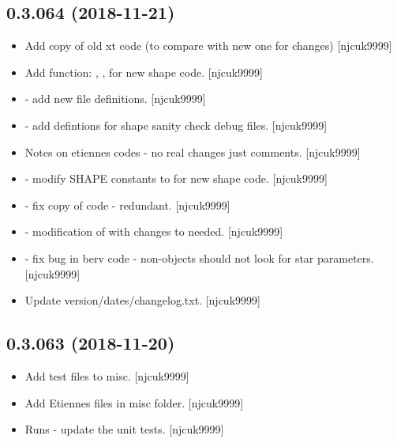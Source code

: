 \documentclass[a4paper,10pt,english]{report}
\begin{document}
\subsection{0.3.064 (2018-11-21)}
\label{\detokenize{misc/changelog:id259}}\begin{itemize}
\item {} 
Add copy of old xt code (to compare with new one for changes)
{[}njcuk9999{]}

\item {} 
Add function: , ,  for
new shape code. {[}njcuk9999{]}

\item {} 
 - add new file definitions. {[}njcuk9999{]}

\item {} 
 - add defintions for shape sanity check debug files.
{[}njcuk9999{]}

\item {} 
Notes on etiennes codes - no real changes just comments. {[}njcuk9999{]}

\item {} 
 - modify SHAPE constants to for new shape
code. {[}njcuk9999{]}

\item {} 
 - fix copy of code - redundant. {[}njcuk9999{]}

\item {} 
 - modification of  with
changes to  needed. {[}njcuk9999{]}

\item {} 
 - fix bug in berv code - non-objects should not look for
star parameters. {[}njcuk9999{]}

\item {} 
Update version/dates/changelog.txt. {[}njcuk9999{]}

\end{itemize}


\subsection{0.3.063 (2018-11-20)}
\label{\detokenize{misc/changelog:id260}}\begin{itemize}
\item {} 
Add test files to misc. {[}njcuk9999{]}

\item {} 
Add Etiennes files in misc folder. {[}njcuk9999{]}

\item {} 
Runs - update the unit tests. {[}njcuk9999{]}

\end{itemize}
\end{document}
